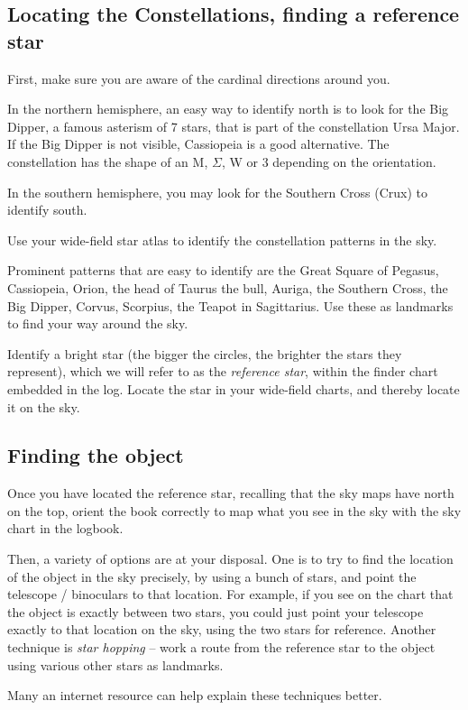 \subsection{Locating the Constellations, finding a reference star}
First, make sure you are aware of the cardinal directions around
you. 

In the northern hemisphere, an easy way to identify north is to look
for the Big Dipper, a famous asterism of 7 stars, that is part of the
constellation Ursa Major. If the Big Dipper is not visible, Cassiopeia
is a good alternative. The constellation has the shape of an M,
$\Sigma$, W or 3 depending on the orientation.

In the southern hemisphere, you may look for the Southern Cross (Crux)
to identify south.

Use your wide-field star atlas to identify the constellation patterns
in the sky.

Prominent patterns that are easy to identify are the Great Square of
Pegasus, Cassiopeia, Orion, the head of Taurus the bull, Auriga, the
Southern Cross, the Big Dipper, Corvus, Scorpius, the Teapot in
Sagittarius. Use these as landmarks to find your way around the sky.

Identify a bright star (the bigger the circles, the brighter the stars
they represent), which we will refer to as the \emph{reference star},
within the finder chart embedded in the log. Locate the star in your
wide-field charts, and thereby locate it on the sky.

\subsection{Finding the object}

Once you have located the reference star, recalling that the sky maps
have north on the top, orient the book correctly to map what you see
in the sky with the sky chart in the logbook.

Then, a variety of options are at your disposal. One is to try to find
the location of the object in the sky precisely, by using a bunch of
stars, and point the telescope / binoculars to that location. For
example, if you see on the chart that the object is exactly between
two stars, you could just point your telescope exactly to that
location on the sky, using the two stars for reference. Another
technique is \emph{star hopping} -- work a route from the reference
star to the object using various other stars as landmarks.

Many an internet resource can help explain these techniques better.


